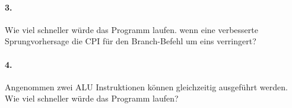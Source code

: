 \documentclass[paper=a4, fontsize=11pt]{scrartcl}
\numberwithin{equation}{section}
\numberwithin{figure}{section}
\numberwithin{table}{section}
\begin{document}
\paragraph{3.}
Wie viel schneller würde das Programm laufen. wenn eine verbesserte Sprungvorhersage die CPI für den Branch-Befehl um eins verringert?

\paragraph{4.}
Angenommen zwei ALU Instruktionen können gleichzeitig ausgeführt werden. Wie viel schneller würde das Programm laufen?

\end{document}
